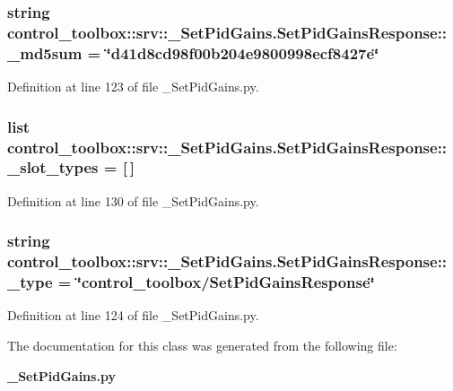 \subsubsection[{\-\_\-md5sum}]{\setlength{\rightskip}{0pt plus 5cm}string {\bf control\-\_\-toolbox\-::srv\-::\-\_\-\-Set\-Pid\-Gains.\-Set\-Pid\-Gains\-Response\-::\-\_\-md5sum} = \char`\"{}d41d8cd98f00b204e9800998ecf8427e\char`\"{}\hspace{0.3cm}{\ttfamily  [static, private]}}\label{classcontrol__toolbox_1_1srv_1_1__SetPidGains_1_1SetPidGainsResponse_aa8d7ced78e3a67a73a41b62aaad8be22}


\-Definition at line 123 of file \-\_\-\-Set\-Pid\-Gains.\-py.

\subsubsection[{\-\_\-slot\-\_\-types}]{\setlength{\rightskip}{0pt plus 5cm}list {\bf control\-\_\-toolbox\-::srv\-::\-\_\-\-Set\-Pid\-Gains.\-Set\-Pid\-Gains\-Response\-::\-\_\-slot\-\_\-types} = [$\,$]\hspace{0.3cm}{\ttfamily  [static, private]}}\label{classcontrol__toolbox_1_1srv_1_1__SetPidGains_1_1SetPidGainsResponse_a4bb9f08c3e3f3536b971c3f9de0fc577}


\-Definition at line 130 of file \-\_\-\-Set\-Pid\-Gains.\-py.

\subsubsection[{\-\_\-type}]{\setlength{\rightskip}{0pt plus 5cm}string {\bf control\-\_\-toolbox\-::srv\-::\-\_\-\-Set\-Pid\-Gains.\-Set\-Pid\-Gains\-Response\-::\-\_\-type} = \char`\"{}control\-\_\-toolbox/{\bf \-Set\-Pid\-Gains\-Response}\char`\"{}\hspace{0.3cm}{\ttfamily  [static, private]}}\label{classcontrol__toolbox_1_1srv_1_1__SetPidGains_1_1SetPidGainsResponse_a31bebd9bf49b9f48927c631581b043fa}


\-Definition at line 124 of file \-\_\-\-Set\-Pid\-Gains.\-py.



\-The documentation for this class was generated from the following file\-:\begin{DoxyCompactItemize}
\item 
{\bf \-\_\-\-Set\-Pid\-Gains.\-py}\end{DoxyCompactItemize}
